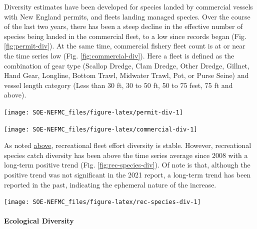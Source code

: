 \documentclass[
  10pt,
]{article}
\let\origfigure\figure
\let\endorigfigure\endfigure
\renewenvironment{figure}[1][2] {
    \expandafter\origfigure\expandafter[H]
} {
    \endorigfigure
}
\begin{document}
Diversity estimates have been developed for species landed by commercial vessels with New England permits, and fleets landing managed species. Over the course of the last two years, there has been a steep decline in the effective number of species being landed in the commercial fleet, to a low since records began (Fig. \ref{fig:permit-div}). At the same time, commercial fishery fleet count is at or near the time series low (Fig. \ref{fig:commercial-div}). Here a fleet is defined as the combination of gear type (Scallop Dredge, Clam Dredge, Other Dredge, Gillnet, Hand Gear, Longline, Bottom Trawl, Midwater Trawl, Pot, or Purse Seine) and vessel length category (Less than 30 ft, 30 to 50 ft, 50 to 75 feet, 75 ft and above).

\begin{figure}

{\centering \texttt{[image: SOE-NEFMC\_files/figure-latex/permit-div-1]} 

}

\caption{Species revenue diversity in New England.}\label{fig:permit-div}
\end{figure}

\begin{figure}

{\centering \texttt{[image: SOE-NEFMC\_files/figure-latex/commercial-div-1]} 

}

\caption{Commercial fleet count and diversity in New England.}\label{fig:commercial-div}
\end{figure}

As noted \protect\hyperlink{recreational-opportunities}{above}, recreational fleet effort diversity is stable. However, recreational species catch diversity has been above the time series average since 2008 with a long-term positive trend (Fig. \ref{fig:rec-species-div}). Of note is that, although the positive trend was not significant in the 2021 report, a long-term trend has been reported in the past, indicating the ephemeral nature of the increase.

\begin{figure}

{\centering \texttt{[image: SOE-NEFMC\_files/figure-latex/rec-species-div-1]} 

}

\caption{Diversity of recreational catch in New England.}\label{fig:rec-species-div}
\end{figure}

\hypertarget{ecological-diversity}{%
\paragraph{Ecological Diversity}\label{ecological-diversity}}
\end{document}
